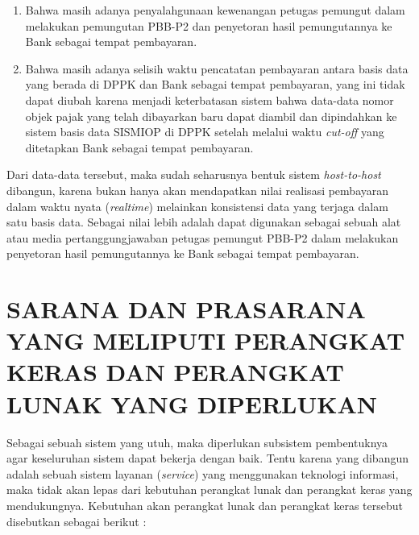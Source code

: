 \documentclass[pdftex,12pt, oneside]{article}
\begin{document}
\begin{enumerate}[1.]
\begin{enumerate}
\item Bahwa masih adanya penyalahgunaan kewenangan petugas pemungut dalam melakukan pemungutan PBB-P2 dan penyetoran hasil pemungutannya ke Bank sebagai tempat pembayaran.

\item Bahwa masih adanya selisih waktu pencatatan pembayaran antara basis data yang berada di DPPK dan Bank sebagai tempat pembayaran, yang ini tidak dapat diubah karena menjadi keterbatasan sistem bahwa data-data nomor objek pajak yang telah dibayarkan baru dapat diambil dan dipindahkan ke sistem basis data SISMIOP di DPPK setelah melalui waktu \textit{cut-off} yang ditetapkan Bank sebagai tempat pembayaran.

\end{enumerate}

\end{enumerate}

Dari data-data tersebut, maka sudah seharusnya bentuk sistem \textit{host-to-host} dibangun, karena bukan hanya akan mendapatkan nilai realisasi pembayaran dalam waktu nyata (\textit{realtime}) melainkan konsistensi data yang terjaga dalam satu basis data. Sebagai nilai lebih adalah dapat digunakan sebagai sebuah alat atau media pertanggungjawaban petugas pemungut PBB-P2 dalam melakukan penyetoran hasil pemungutannya ke Bank sebagai tempat pembayaran.

\section{SARANA DAN PRASARANA YANG MELIPUTI PERANGKAT KERAS DAN PERANGKAT LUNAK YANG DIPERLUKAN}

Sebagai sebuah sistem yang utuh, maka diperlukan subsistem pembentuknya agar keseluruhan sistem dapat bekerja dengan baik. Tentu karena yang dibangun adalah sebuah sistem layanan (\textit{service}) yang menggunakan teknologi informasi, maka tidak akan lepas dari kebutuhan perangkat lunak dan perangkat keras yang mendukungnya. Kebutuhan akan perangkat lunak dan perangkat keras tersebut disebutkan sebagai berikut :
\end{document}
